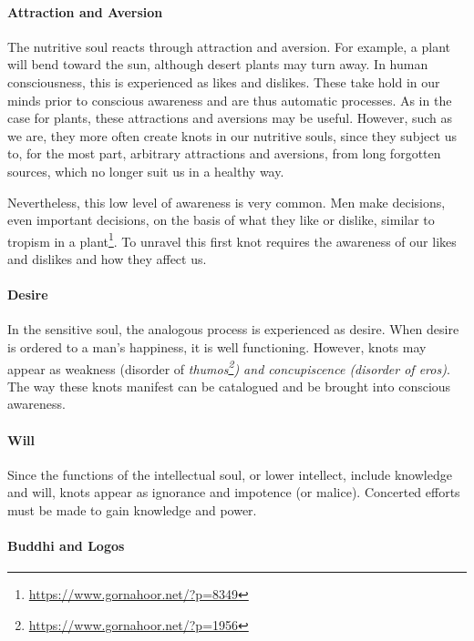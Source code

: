 \paragraph{Attraction and Aversion}

The nutritive soul reacts through attraction and aversion. For example, a plant will bend toward the sun, although desert plants may turn away. In human consciousness, this is experienced as likes and dislikes. These take hold in our minds prior to conscious awareness and are thus automatic processes. As in the case for plants, these attractions and aversions may be useful. However, such as we are, they more often create knots in our nutritive souls, since they subject us to, for the most part, arbitrary attractions and aversions, from long forgotten sources, which no longer suit us in a healthy way.

Nevertheless, this low level of awareness is very common. Men make decisions, even important decisions, on the basis of what they like or dislike, similar to tropism in a plant\footnote{\url{https://www.gornahoor.net/?p=8349}}. To unravel this first knot requires the awareness of our likes and dislikes and how they affect us.

\paragraph{Desire}


In the sensitive soul, the analogous process is experienced as desire. When desire is ordered to a man's happiness, it is well functioning. However, knots may appear as weakness (disorder of \emph{thumos\footnote{\url{https://www.gornahoor.net/?p=1956}}) and concupiscence (disorder of
\emph{eros})}. The way these knots manifest can be catalogued and be brought into conscious awareness.

\paragraph{Will}


Since the functions of the intellectual soul, or lower intellect, include knowledge and will, knots appear as ignorance and impotence (or malice). Concerted efforts must be made to gain knowledge and power.

\paragraph{Buddhi and Logos}


